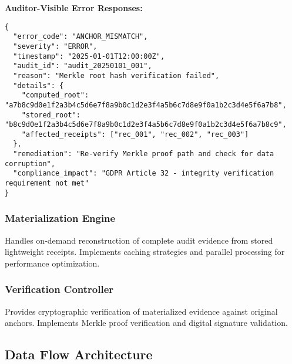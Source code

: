 \documentclass[12pt,a4paper]{article}
\begin{document}
\begin{technicalbox}
\textbf{Auditor-Visible Error Responses:}
\begin{lstlisting}[caption=Structured Error Response Format]
{
  "error_code": "ANCHOR_MISMATCH",
  "severity": "ERROR", 
  "timestamp": "2025-01-01T12:00:00Z",
  "audit_id": "audit_20250101_001",
  "reason": "Merkle root hash verification failed",
  "details": {
    "computed_root": "a7b8c9d0e1f2a3b4c5d6e7f8a9b0c1d2e3f4a5b6c7d8e9f0a1b2c3d4e5f6a7b8",
    "stored_root": "b8c9d0e1f2a3b4c5d6e7f8a9b0c1d2e3f4a5b6c7d8e9f0a1b2c3d4e5f6a7b8c9",
    "affected_receipts": ["rec_001", "rec_002", "rec_003"]
  },
  "remediation": "Re-verify Merkle proof path and check for data corruption",
  "compliance_impact": "GDPR Article 32 - integrity verification requirement not met"
}
\end{lstlisting}
\end{technicalbox}

\subsubsection{Materialization Engine}

Handles on-demand reconstruction of complete audit evidence from stored lightweight receipts. Implements caching strategies and parallel processing for performance optimization.

\subsubsection{Verification Controller}

Provides cryptographic verification of materialized evidence against original anchors. Implements Merkle proof verification and digital signature validation.

\subsection{Data Flow Architecture}
\end{document}
